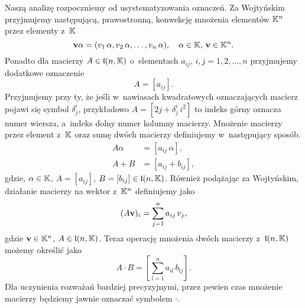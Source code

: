 \documentclass[a4paper,11pt]{article}
\begin{document}
Naszą analizę rozpoczniemy od usystematyzowania oznaczeń. Za Wojtyńskim
przyjmujemy następującą, prawostronną, konwekcję mnożenia elementów
$\mathbb{K}^{ n }$ przez elementy z~$\mathbb{K}$
\begin{equation}
  \label{eq:Wojtynski-41}
  \mathbf{v} \alpha = ( v_{ 1 } \, \alpha, v_{ 2 } \, \alpha, \ldots, v_{ n } \, \alpha ), \quad
  \alpha \in \mathbb{K}, \, \mathbf{v} \in \mathbb{K}^{ n }.
\end{equation}
Ponadto dla macierzy $A \in \mathfrak{l}( n, \mathbb{K} )$ o~elementach $a_{ ij }$,
$i, j = 1, 2, \ldots, n$ przyjmujemy dodatkowe oznaczenie
\begin{equation}
  \label{eq:Wojtynski-42}
  A = [ a_{ i j } ].
\end{equation}
Przyjmujemy przy ty, że jeśli w~nawiasach kwadratowych oznaczających macierz
pojawi się symbol $\delta^{ i }_{ j }$, przykładowo
$A = [ 2 j + \delta^{ i }_{ j } \, i^{ 2 } ]$ to indeks górny oznacza numer
wiersza, a~indeks dolny numer kolumny macierzy. Mnożenie macierzy przez
element z~$\mathbb{K}$ oraz sumę dwóch macierzy definiujemy w~następujący sposób.
\begin{subequations}
  \begin{align}
    \label{eq:Wojtynski-43-A}
    A \alpha &= [ a_{ i j } \, \alpha ], \\
    \label{eq:Wojtynski-43-B}
    A + B &= [ a_{ i j } + b_{ i j } ],
  \end{align}
\end{subequations}
gdzie, $\alpha \in \mathbb{K}$, $A = [ a_{ i j } ]$,
$B = [ b_{ i j } ] \in \mathfrak{l}( n, \mathbb{K} )$.
Również podążając za Wojtyńskim, działanie macierzy na wektor z~$\mathbb{K}^{ n }$
definiujemy jako
\begin{equation}
  \label{eq:Wojtynski-44}
  ( A \mathbf{v} )_{ i } = \sum_{ j = 1 }^{ n } a_{ i j } \, v_{ j },
\end{equation}
gdzie $\mathbf{v} \in \mathbb{K}^{ n }$, $A \in \mathfrak{l}( n, \mathbb{K} )$. Teraz operację
mnożenia dwóch macierzy z~$\mathfrak{l}( n, \mathbb{K} )$ możemy określić jako
\begin{equation}
  \label{eq:Wojtynski-45}
  A \cdot B = \left[ \sum_{ l = 1 }^{ n } a_{ i l } \, b_{ l j } \right].
\end{equation}
Dla uczynienia rozważań bardziej precyzyjnymi, przez pewien czas mnożenie
macierzy będziemy jawnie oznaczać symbolem $\cdot$.
\end{document}
